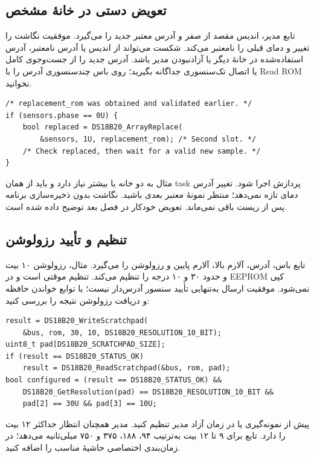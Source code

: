 \subsection{تعویض دستی در خانهٔ مشخص}
تابع
مدیر، اندیس مقصد از صفر و آدرس معتبر جدید را می‌گیرد. موفقیت نگاشت را تغییر و
دمای قبلی را نامعتبر می‌کند. شکست می‌تواند از اندیس یا آدرس نامعتبر، آدرس
استفاده‌شده در خانهٔ دیگر یا آزادنبودن مدیر باشد. آدرس جدید را از جست‌وجوی کامل
یا اتصال تک‌سنسوری جداگانه بگیرید؛ روی باس چندسنسوری آدرس را با Read ROM نخوانید.
\begin{LTR}
\begin{lstlisting}
/* replacement_rom was obtained and validated earlier. */
if (sensors.phase == 0U) {
    bool replaced = DS18B20_ArrayReplace(
        &sensors, 1U, replacement_rom); /* Second slot. */
    /* Check replaced, then wait for a valid new sample. */
}
\end{lstlisting}
\end{LTR}
مثال به دو خانه یا بیشتر نیاز دارد و باید از همان task پردازش اجرا شود. تغییر
آدرس دمای تازه نمی‌دهد؛ منتظر نمونهٔ معتبر بعدی باشید. نگاشت بدون ذخیره‌سازی
برنامه پس از ریست باقی نمی‌ماند. تعویض خودکار در فصل بعد توضیح داده شده است.

\subsection{تنظیم و تأیید رزولوشن}
تابع
باس، آدرس، آلارم بالا، آلارم پایین و رزولوشن را می‌گیرد. مثال، رزولوشن ۱۰ بیت و
حدود ۳۰ و ۱۰ درجه را تنظیم می‌کند. تنظیم موقتی است و در EEPROM کپی نمی‌شود.
موفقیت ارسال به‌تنهایی تأیید سنسور آدرس‌دار نیست؛ با توابع خواندن حافظه و
دریافت رزولوشن نتیجه را بررسی کنید:
\begin{LTR}
\begin{lstlisting}
result = DS18B20_WriteScratchpad(
    &bus, rom, 30, 10, DS18B20_RESOLUTION_10_BIT);
uint8_t pad[DS18B20_SCRATCHPAD_SIZE];
if (result == DS18B20_STATUS_OK)
    result = DS18B20_ReadScratchpad(&bus, rom, pad);
bool configured = (result == DS18B20_STATUS_OK) &&
    DS18B20_GetResolution(pad) == DS18B20_RESOLUTION_10_BIT &&
    pad[2] == 30U && pad[3] == 10U;
\end{lstlisting}
\end{LTR}
پیش از نمونه‌گیری یا در زمان آزاد مدیر تنظیم کنید. مدیر همچنان انتظار حداکثر
۱۲ بیت را دارد. تابع
برای ۹ تا ۱۲ بیت به‌ترتیب ۹۴، ۱۸۸، ۳۷۵ و ۷۵۰ میلی‌ثانیه می‌دهد؛ در زمان‌بندی
اختصاصی حاشیهٔ مناسب را اضافه کنید.

